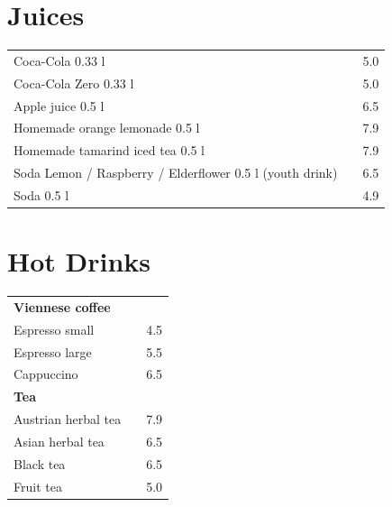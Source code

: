 \documentclass[a4paper,12pt]{article}
\begin{document}
\small
\titlespacing*{\section}{0pt}{0.45em}{0.25em}
\setlength{\columnsep}{0.7cm}
\begin{multicols}{2}

\section*{Juices}
\begin{tabular}{Lrr}
Coca-Cola 0.33 l & & 5.0\\
Coca-Cola Zero 0.33 l & & 5.0\\
Apple juice 0.5 l & & 6.5\\
Homemade orange lemonade 0.5 l & & 7.9\\
Homemade tamarind iced tea 0.5 l & & 7.9\\
Soda Lemon / Raspberry / Elderflower 0.5 l (youth drink) & & 6.5\\
Soda 0.5 l & & 4.9
\end{tabular}

\section*{Hot Drinks}
\begin{tabular}{Lrr}
\textbf{Viennese coffee}\\
\hspace{0.4cm}Espresso small & & 4.5\\
\hspace{0.4cm}Espresso large & & 5.5\\
\hspace{0.4cm}Cappuccino & & 6.5\vspace{0.1cm}\\
\textbf{Tea}\\
\hspace{0.4cm}Austrian herbal tea & & 7.9\\
\hspace{0.4cm}Asian herbal tea & & 6.5\\
\hspace{0.4cm}Black tea & & 6.5\\
\hspace{0.4cm}Fruit tea & & 5.0
\end{tabular}


\end{multicols}
\end{document}
